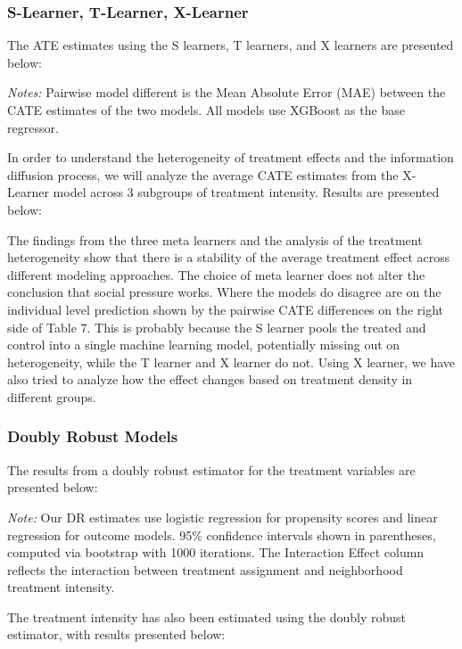 \documentclass[11pt]{article}
\begin{document}
\subsubsection{S-Learner, T-Learner, X-Learner}
The ATE estimates using the S learners, T learners, and X learners are presented below:

\textit{Notes:} Pairwise model different is the Mean Absolute Error (MAE) between the CATE estimates of the two models. All models use XGBoost as the base regressor.

In order to understand the heterogeneity of treatment effects and the information diffusion process, we will analyze the average CATE estimates from the X-Learner model across 3 subgroups of treatment intensity. Results are presented below:


The findings from the three meta learners and the analysis of the treatment heterogeneity show that there is a stability of the average treatment effect across different modeling approaches. The choice of meta learner does not alter the conclusion that social pressure works. Where the models do disagree are on the individual level prediction shown by the pairwise CATE differences on the right side of Table 7. This is probably because the S learner pools the treated and control into a single machine learning model, potentially missing out on heterogeneity, while the T learner and X learner do not. Using X learner, we have also tried to analyze how the effect changes based on treatment density in different groups.

\subsubsection{Doubly Robust Models}
The results from a doubly robust estimator for the treatment variables are presented below:
\begin{table}[H]
\centering
\caption{Treatment Effects on Voter Turnout: Doubly Robust Estimates vs. Original Paper}

\end{table}
\textit{Note:} Our DR estimates use logistic regression for propensity scores and linear regression for outcome models. 95\% confidence intervals shown in parentheses, computed via bootstrap with 1000 iterations. The Interaction Effect column reflects the interaction between treatment assignment and neighborhood treatment intensity.


The treatment intensity has also been estimated using the doubly robust estimator, with results presented below: 
\end{document}
